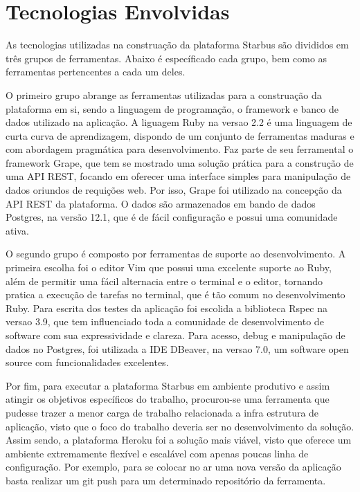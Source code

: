 \chapter{Tecnologias Envolvidas} \label{cha:tecnologias-envolvidas}

As tecnologias utilizadas na construação da plataforma Starbus são divididos em três grupos de ferramentas. 
Abaixo é específicado cada grupo, bem como as ferramentas pertencentes a cada um deles. 

O primeiro grupo abrange as ferramentas utilizadas para a construação da plataforma em si, sendo a linguagem
de programação, o framework e banco de dados utilizado na aplicação. A liguagem Ruby na versao 2.2 é uma linguagem 
de curta curva de aprendizagem, dispondo de um conjunto de ferramentas maduras e com abordagem pragmática para 
desenvolvimento. Faz parte de seu ferramental o framework Grape, que tem se mostrado uma solução prática para 
a construção de uma API REST, focando em oferecer uma interface simples para manipulação de dados oriundos de 
requições web. Por isso, Grape foi utilizado na concepção da API REST da plataforma. O dados são armazenados em 
bando de dados Postgres, na versão 12.1, que é de fácil configuração e possui uma comunidade ativa. 

O segundo grupo é composto por ferramentas de suporte ao desenvolvimento. A primeira escolha foi o editor Vim que 
possui uma excelente suporte ao Ruby, além de permitir uma fácil alternacia entre o terminal e o editor, tornando 
pratica a execução de tarefas no terminal, que é tão comum no desenvolvimento Ruby. Para escrita dos testes da 
aplicação foi escolida a biblioteca Rspec na versao 3.9, que tem influenciado toda a comunidade de desenvolvimento
de software com sua expressividade e clareza. Para acesso, debug e manipulação de dados no Postgres, foi utilizada 
a IDE DBeaver, na versao 7.0, um software open source com funcionalidades excelentes.     

Por fim, para executar a plataforma Starbus em ambiente produtivo e assim atingir os objetivos específicos do 
trabalho, procurou-se uma ferramenta que pudesse trazer a menor carga de trabalho relacionada a infra estrutura 
de aplicação, visto que o foco do trabalho deveria ser no desenvolvimento da solução. Assim sendo, a plataforma 
Heroku foi a solução mais viável, visto que oferece um ambiente extremamente flexível e escalável com apenas poucas 
linha de configuração. Por exemplo, para se colocar no ar uma nova versão da aplicação basta realizar um git push para 
um determinado repositório da ferramenta.
